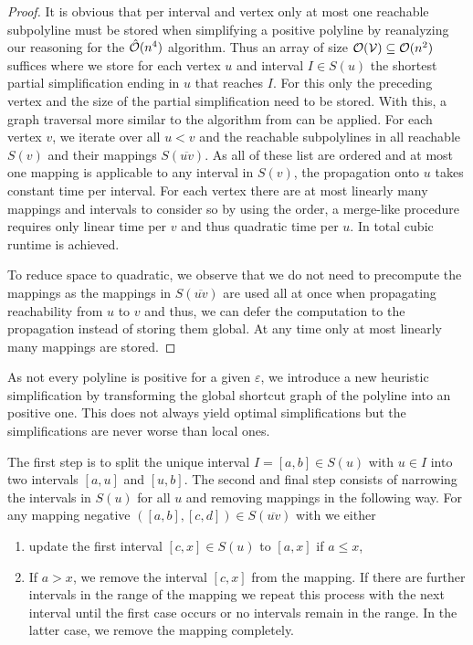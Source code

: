 \begin{proof}
	It is obvious that per interval and vertex only at most one reachable subpolyline must be stored when simplifying a positive polyline by reanalyzing our reasoning for the \(\hat{\mathcal{O}}(n^4)\) algorithm. Thus an array of size \(\mathcal{O}(\mathcal{V}) \subseteq \mathcal{O}(n^2)\) suffices where we store for each vertex \(u\) and interval \(I \in S(u)\) the shortest partial simplification ending in \(u\) that reaches \(I\). For this only the preceding vertex and the size of the partial simplification need to be stored. With this, a graph traversal more similar to the algorithm from \citeauthor{computational_geometric_methods_for_polygonal_approximations_of_a_curve} can be applied. For each vertex \(v\), we iterate over all \(u < v\) and the reachable subpolylines in all reachable \(S(v)\) and their mappings \(S(\overline{uv})\). As all of these list are ordered and at most one mapping is applicable to any interval in \(S(v)\), the propagation onto \(u\) takes constant time per interval. For each vertex there are at most linearly many mappings and intervals to consider so by using the order, a merge-like procedure requires only linear time per \(v\) and thus quadratic time per \(u\). In total cubic runtime is achieved. 

	To reduce space to quadratic, we observe that we do not need to precompute the mappings as the mappings in \(S(\overline{uv})\) are used all at once when propagating reachability from \(u\) to \(v\) and thus, we can defer the computation to the propagation instead of storing them global. At any time only at most linearly many mappings are stored.
\end{proof}

As not every polyline is positive for a given \(\varepsilon\), we introduce a new heuristic simplification by transforming the global shortcut graph of the polyline into an positive one. This does not always yield optimal simplifications but the simplifications are never worse than local ones.

The first step is to split the unique interval \(I = [a, b] \in S(u)\) with \(u \in I\) into two intervals \([a, u]\) and \([u, b]\). The second and final step consists of narrowing the intervals in \(S(u)\) for all \(u\) and removing mappings in the following way. For any mapping negative \(([a,b], [c,d]) \in S(\overline{uv})\) with we either 
\begin{enumerate}
	\item update the first interval \([c, x] \in S(u)\) to \([a, x]\) if \(a \leq x\),
	\item If \(a > x\), we remove the interval \([c, x]\) from the mapping. If there are further intervals in the range of the mapping we repeat this process with the next interval until the first case occurs or no intervals remain in the range. In the latter case, we remove the mapping completely.
\end{enumerate}

